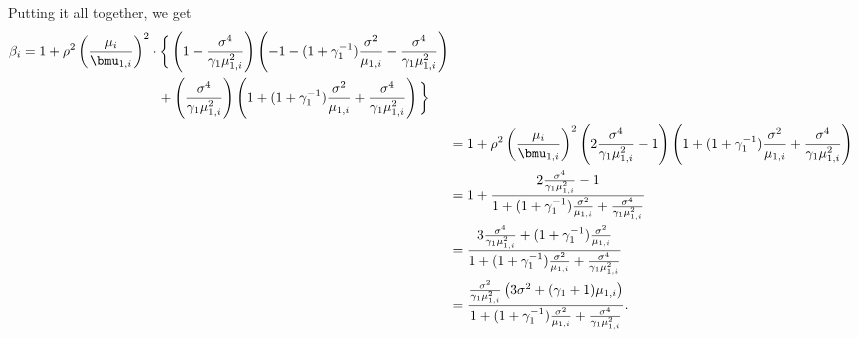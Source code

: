 Putting it all together, we get
\begin{align}
    \begin{split}
    \beta_i
        &=
            1
            +
            \rho^2
            \left(
                \frac{\mu_i}{\bmu_{1,i}}
            \right)^2 
            \cdot
            \bigg\{
                \left(
                    1
                    -
                    \frac{\sigma^4}{\gamma_1 \mu_{1,i}^2}
                \right)
                \left(
                    -
                    1
                    -
                    (1 + \gamma_1^{-1})
                    \frac{\sigma^2}{\mu_{1,i}}
                    -
                    \frac{\sigma^4}{\gamma_1 \mu_{1,i}^2}
                \right) \\
            &\qquad\qquad\qquad\qquad\qquad+
                \left(
                    \frac{\sigma^4}{\gamma_1 \mu_{1,i}^2}
                \right)
                \left(
                    1
                    +
                    (1 + \gamma_1^{-1})
                    \frac{\sigma^2}{\mu_{1,i}}
                    +
                    \frac{\sigma^4}{\gamma_1 \mu_{1,i}^2}
                \right)
            \bigg\}
    \end{split} \notag \\
    &=
        1
        +
        \rho^2
        \left(
            \frac{\mu_i}{\bmu_{1,i}}
        \right)^2
        \left(
            2
            \frac{\sigma^4}{\gamma_1 \mu_{1,i}^2}
            -
            1
        \right)
        \left(
            1
            +
            (1 + \gamma_1^{-1})
            \frac{\sigma^2}{\mu_{1,i}}
            +
            \frac{\sigma^4}{\gamma_1 \mu_{1,i}^2}
        \right) \notag \\
    &=
        1
        +
        \frac{2 \frac{\sigma^4}{\gamma_1 \mu_{1,i}^2} - 1}
             {
                1
                +
                (1 + \gamma_1^{-1})
                \frac{\sigma^2}{\mu_{1,i}}
                +
                \frac{\sigma^4}{\gamma_1 \mu_{1,i}^2}
             } \notag \\
    &=
        \frac{ 3 \frac{\sigma^4}{\gamma_1 \mu_{1,i}^2} 
               +
               (1 + \gamma_1^{-1})
               \frac{\sigma^2}{\mu_{1,i}}
             }
             {
                1
                +
                (1 + \gamma_1^{-1})
                \frac{\sigma^2}{\mu_{1,i}}
                +
                \frac{\sigma^4}{\gamma_1 \mu_{1,i}^2}
             } \notag \\
    &=
        \frac{
            \frac{\sigma^2}{\gamma_1 \mu_{1,i}^2}
            \left(
                3 \sigma^2
                +
                (\gamma_1 + 1)
                \mu_{1,i}
            \right)
        }
        {
            1
            +
            (1 + \gamma_1^{-1})
            \frac{\sigma^2}{\mu_{1,i}}
            +
            \frac{\sigma^4}{\gamma_1 \mu_{1,i}^2}
        }.
\end{align}
